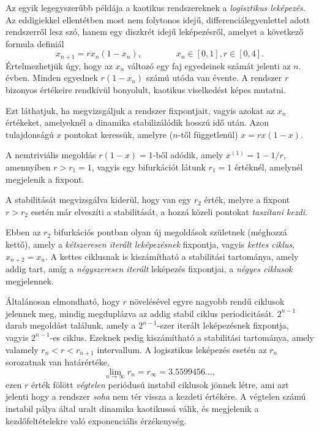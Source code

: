 \documentclass[12pt]{article}
\theoremstyle{plain}
\begin{document}
Az egyik legegyszerűbb példája a kaotikus rendszereknek a {\em logisztikus leképezés}. Az eddigiekkel ellentétben most nem folytonos idejű, differenciálegyenlettel adott rendszerről lesz szó, hanem egy diszkrét idejű leképezésről, amelyet a következő formula definiál
\begin{equation}
    x_{n+1} = rx_n(1-x_n), \qquad \qquad x_n \in [0,1], r\in [0,4].
\end{equation}
Értelmezhetjük úgy, hogy az $x_n$ változó egy faj egyedeinek számát jelenti az $n.$ évben. Minden egyednek $r(1-x_n)$ számú utóda van évente. A rendszer $r$ bizonyos értékeire rendkívül bonyolult, kaotikus viselkedést képes mutatni. 

Ezt láthatjuk, ha megvizsgáljuk a rendszer fixpontjait, vagyis azokat az $x_n$ értékeket, amelyeknél a dinamika stabilizálódik hosszú idő után. Azon tulajdonságú $x$ pontokat keressük, amelyre ($n$-től függetlenül) $x = rx(1-x)$.

A nemtriviális megoldás $r(1-x) = 1$-ből adódik, amely $x^{(1)} = 1- 1/r$, amennyiben $r>r_1=1$, vagyis egy bifurkációt látunk $r_1=1$ értéknél, amelynél megjelenik a fixpont. 

A stabilitását megvizsgálva kiderül, hogy van egy $r_2$ érték, melyre a fixpont $r>r_2$  esetén már elveszíti a stabilitását, a hozzá közeli pontokat {\em taszítani kezdi}.

Ebben az $r_2$ bifurkációs pontban olyan új megoldások születnek (méghozzá kettő), amely a {\em kétszeresen iterált leképezésnek} fixpontja, vagyis {\em kettes ciklus}, $x_{n+2} = x_n$. A kettes ciklusnak is kiszámítható a stabilitási tartománya, amely addig tart, amíg a {\em négyszeresen iterált} leképezés fixpontjai, a {\em négyes ciklusok} megjelennek. 

Általánosan elmondható, hogy $r$ növelésével egyre nagyobb rendű ciklusok jelennek meg, mindig megduplázva az addig stabil ciklus periodicitását. $2^{n-1}$ darab megoldást találunk, amely a $2^{n-1}$-szer iterált leképezésnek fixpontja, vagyis $2^{n-1}$-es ciklus. Ezeknek pedig kiszámítható a stabilitási tartománya, amely valamely $r_n < r < r_{n+1}$ intervallum. A logisztikus leképezés esetén az $r_n$ sorozatnak van határértéke, 
\begin{equation}
    \lim_{n \to \infty} r_n = r_{\infty} = 3.5599456...,
\end{equation}
ezen $r$ érték fölött {\em végtelen} periódusú instabil ciklusok jönnek létre, ami azt jelenti hogy a rendszer {\em soha} nem tér vissza a kezdeti értékére. A végtelen számú instabil pálya által uralt dinamika kaotikussá válik, és megjelenik a kezdőfeltételekre való exponenciális érzékenység.
\end{document}
